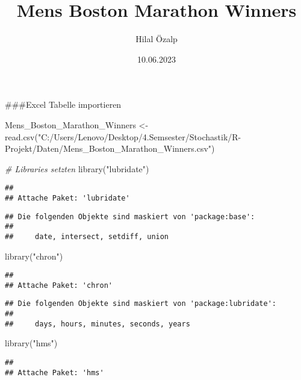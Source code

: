 \documentclass[
]{article}
\title{Mens Boston Marathon Winners}
\author{Hilal Özalp}
\date{10.06.2023}
\newenvironment{Shaded}{\begin{snugshade}}{\end{snugshade}}
\newcommand{\CommentTok}[1]{\textcolor[rgb]{0.56,0.35,0.01}{\textit{#1}}}
\newcommand{\FunctionTok}[1]{\textcolor[rgb]{0.00,0.00,0.00}{#1}}
\newcommand{\NormalTok}[1]{#1}
\newcommand{\OtherTok}[1]{\textcolor[rgb]{0.56,0.35,0.01}{#1}}
\newcommand{\StringTok}[1]{\textcolor[rgb]{0.31,0.60,0.02}{#1}}
\begin{document}
\maketitle

\#\#\#Excel Tabelle importieren

\begin{Shaded}
\begin{Highlighting}[]
\NormalTok{Mens\_Boston\_Marathon\_Winners }\OtherTok{\textless{}{-}}
  \FunctionTok{read.csv}\NormalTok{(}\StringTok{"C:/Users/Lenovo/Desktop/4.Semsester/Stochastik/R{-}Projekt/Daten/Mens\_Boston\_Marathon\_Winners.csv"}\NormalTok{)}

\CommentTok{\# Libraries setzten}
\FunctionTok{library}\NormalTok{(}\StringTok{"lubridate"}\NormalTok{)}
\end{Highlighting}
\end{Shaded}

\begin{verbatim}
## 
## Attache Paket: 'lubridate'
\end{verbatim}

\begin{verbatim}
## Die folgenden Objekte sind maskiert von 'package:base':
## 
##     date, intersect, setdiff, union
\end{verbatim}

\begin{Shaded}
\begin{Highlighting}[]
\FunctionTok{library}\NormalTok{(}\StringTok{"chron"}\NormalTok{)}
\end{Highlighting}
\end{Shaded}

\begin{verbatim}
## 
## Attache Paket: 'chron'
\end{verbatim}

\begin{verbatim}
## Die folgenden Objekte sind maskiert von 'package:lubridate':
## 
##     days, hours, minutes, seconds, years
\end{verbatim}

\begin{Shaded}
\begin{Highlighting}[]
\FunctionTok{library}\NormalTok{(}\StringTok{"hms"}\NormalTok{)}
\end{Highlighting}
\end{Shaded}

\begin{verbatim}
## 
## Attache Paket: 'hms'
\end{verbatim}
\end{document}
